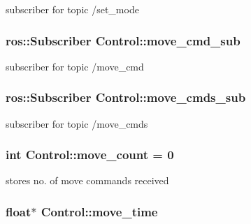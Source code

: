 subscriber for topic /set\+\_\+mode 

\subsubsection[{\texorpdfstring{move\+\_\+cmd\+\_\+sub}{move_cmd_sub}}]{\setlength{\rightskip}{0pt plus 5cm}ros\+::\+Subscriber Control\+::move\+\_\+cmd\+\_\+sub\hspace{0.3cm}{\ttfamily [private]}}\hypertarget{classControl_a3b230d6b582855242669b6fffbb3d949}{}\label{classControl_a3b230d6b582855242669b6fffbb3d949}


subscriber for topic /move\+\_\+cmd 

\subsubsection[{\texorpdfstring{move\+\_\+cmds\+\_\+sub}{move_cmds_sub}}]{\setlength{\rightskip}{0pt plus 5cm}ros\+::\+Subscriber Control\+::move\+\_\+cmds\+\_\+sub\hspace{0.3cm}{\ttfamily [private]}}\hypertarget{classControl_aef0dbc702813737f7860676376c58e2e}{}\label{classControl_aef0dbc702813737f7860676376c58e2e}


subscriber for topic /move\+\_\+cmds 

\subsubsection[{\texorpdfstring{move\+\_\+count}{move_count}}]{\setlength{\rightskip}{0pt plus 5cm}int Control\+::move\+\_\+count = 0\hspace{0.3cm}{\ttfamily [private]}}\hypertarget{classControl_a5aa7f5d4f2ef0a5b28658ff4d0c42251}{}\label{classControl_a5aa7f5d4f2ef0a5b28658ff4d0c42251}


stores no. of move commands received 

\subsubsection[{\texorpdfstring{move\+\_\+time}{move_time}}]{\setlength{\rightskip}{0pt plus 5cm}float$\ast$ Control\+::move\+\_\+time\hspace{0.3cm}{\ttfamily [private]}}\hypertarget{classControl_a4274ca145ba190a4d246b7b28d2553cc}{}\label{classControl_a4274ca145ba190a4d246b7b28d2553cc}



